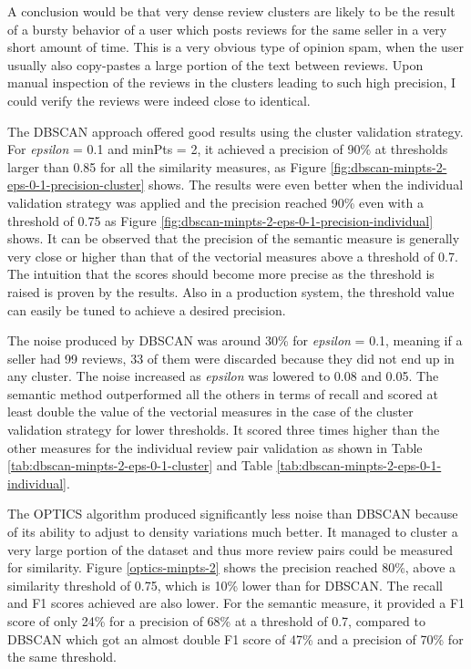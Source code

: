 A conclusion would be that very dense review clusters are likely to be the result of a bursty behavior of a user which posts reviews for the same seller in a very short amount of time. This is a very obvious type of opinion spam, when the user usually also copy-pastes a large portion of the text between reviews. Upon manual inspection of the reviews in the clusters leading to such high precision, I could verify the reviews were indeed close to identical.

The DBSCAN approach offered good results using the cluster validation strategy. For \textit{epsilon} = 0.1 and minPts = 2, it achieved a precision of  90\% at thresholds larger than 0.85 for all the similarity measures, as Figure \ref{fig:dbscan-minpts-2-eps-0-1-precision-cluster} shows. The results were even better when the individual validation strategy was applied and the precision reached 90\% even with a threshold of 0.75 as Figure \ref{fig:dbscan-minpts-2-eps-0-1-precision-individual} shows. It can be observed that the precision of the semantic measure is generally very close or higher than that of the vectorial measures above a threshold of 0.7. The intuition that the scores should become more precise as the threshold is raised is proven by the results. Also in a production system, the threshold value can easily be tuned to achieve a desired precision.

The noise produced by DBSCAN was around 30\% for \textit{epsilon} = 0.1, meaning if a seller had 99 reviews, 33 of them were discarded because they did not end up in any cluster. The noise increased as \textit{epsilon} was lowered to 0.08 and 0.05. The semantic method outperformed all the others in terms of recall and scored at least double the value of the vectorial measures in the case of the cluster validation strategy for lower thresholds. It scored three times higher than the other measures for the individual review pair validation as shown in Table \ref{tab:dbscan-minpts-2-eps-0-1-cluster} and Table \ref{tab:dbscan-minpts-2-eps-0-1-individual}. 

The OPTICS algorithm produced significantly less noise than DBSCAN because of its ability to adjust to density variations much better. It managed to cluster a very large portion of the dataset and thus more review pairs could be measured for similarity. Figure \ref{optics-minpts-2} shows the precision reached 80\%, above a similarity threshold of 0.75, which is 10\% lower than for DBSCAN. The recall and F1 scores achieved are also lower. For the semantic measure, it provided a F1 score of only 24\% for a precision of 68\% at a threshold of 0.7, compared to DBSCAN which got an almost double F1 score of 47\% and a precision of 70\% for the same threshold.


